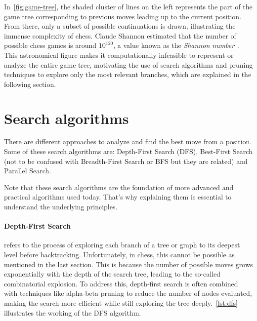 \vspace{1em}

\noindent In~\cref{fig:game-tree}, the shaded cluster of lines on the left represents the part of the game tree corresponding to previous moves leading up to the current position. From there, only a subset of possible continuations is drawn, illustrating the immense complexity of chess. Claude Shannon estimated that the number of possible chess games is around $10^{120}$, a value known as the \textit{Shannon number}~\cite{Shannon1950}. This astronomical figure makes it computationally infeasible to represent or analyze the entire game tree, motivating the use of search algorithms and pruning techniques to explore only the most relevant branches, which are explained in the following section.

\section{Search algorithms}

There are different approaches to analyze and find the best move from a position. Some of these search algorithms are: Depth-First Search (DFS), Best-First Search (not to be confused with Breadth-First Search or BFS but they are related) and Parallel Search.

\vspace{1em}

\noindent Note that these search algorithms are the foundation of more advanced and practical algorithms used today. That's why explaining them is essential to understand the underlying principles.

\paragraph{Depth-First Search} refers to the process of exploring each branch of a tree or graph to its deepest level before backtracking. Unfortunately, in chess, this cannot be possible as mentioned in the last section. This is because the number of possible moves grows exponentially with the depth of the search tree, leading to the so-called combinatorial explosion. To address this, depth-first search is often combined with techniques like alpha-beta pruning to reduce the number of nodes evaluated, making the search more efficient while still exploring the tree deeply.~\cref{lst:dfs} illustrates the working of the DFS algorithm.

\vspace{1em}

